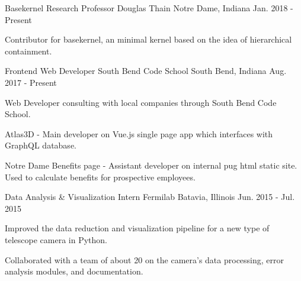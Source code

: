 \begin{cventries}
  \cventry
    {Basekernel Research}
    {Professor Douglas Thain}
    {Notre Dame, Indiana}
    {Jan. 2018 - Present}
    {
      \begin{cvitems}
        \item {Contributor for basekernel, an minimal kernel based on the idea of hierarchical containment.}
      \end{cvitems}
    }
  \cventry
    {Frontend Web Developer}
    {South Bend Code School}
    {South Bend, Indiana}
    {Aug. 2017 - Present}
    {
      \begin{cvitems}
        \item {Web Developer consulting with local companies through South Bend Code School.}
        \item {Atlas3D - Main developer on Vue.js single page app which interfaces with GraphQL database.}
        \item {{Notre Dame Benefits page} - Assistant developer on internal pug html static site.  Used to calculate benefits for prospective employees.}
      \end{cvitems}
    }
\iffalse
  \cventry
    {Donation Facilitator}
    {Notre Dame Alumni Center}
    {Notre Dame, Indiana}
    {Sep. 2016 - May. 2017}
    {
      \begin{cvitems}
        \item {Facilitated financial contributions to the University for various causes and campaigns.}
        \item {Exceeded the average amount of donations by more than 17\% in every report.}
      \end{cvitems}
    }
\fi
  \cventry
    {Data Analysis \& Visualization Intern}
    {Fermilab}
    {Batavia, Illinois}
    {Jun. 2015 - Jul. 2015}
    {
      \begin{cvitems}
        \item {Improved the data reduction and visualization pipeline for a new type
of telescope camera in Python.}
        \item {Collaborated with a team of about 20 on the camera’s data processing, error analysis modules, and documentation.}
      \end{cvitems}
    }
\end{cventries}
